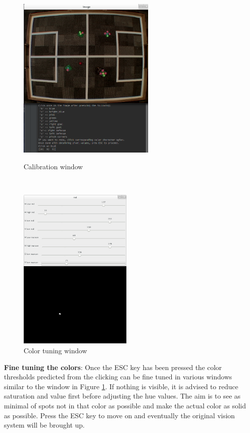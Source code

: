 \documentclass[a4paper,12pt]{article}
\begin{document}
\begin{figure}[b!]
  \centering
  \begin{minipage}[c]{7cm}
    \centering
    \includegraphics[height=8cm]{images/calibration2.png}
    \caption{Calibration window} \label{fig:color}
  \end{minipage}
  ~
  \begin{minipage}[c]{7cm}
    \centering
    \includegraphics[height=8cm]{images/calibration3.png}
    \caption{Color tuning window} \label{fig:tune}
  \end{minipage}
\end{figure}

\textbf{Fine tuning the colors}: Once the ESC key has been pressed the color thresholds predicted from the clicking can be fine tuned in various windows similar to the window in Figure \ref{fig:tune}. If nothing is visible, it is advised to reduce saturation and value first before adjusting the hue values. The aim is to see as minimal of spots not in that color as possible and make the actual color as solid as possible. Press the ESC key to move on and eventually the original vision system will be brought up.
\end{document}
